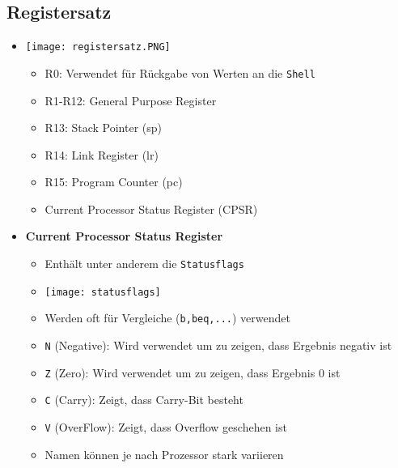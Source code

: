 \subsection{Registersatz}
    \begin{itemize}
        \item[]
            \begin{minipage}{0.2\textwidth}
            \texttt{[image: registersatz.PNG]}
            \end{minipage}
            \begin{minipage}[t]{0.7\textwidth}
            \vspace{-3cm}
                \begin{itemize}
                    \item R0: Verwendet für Rückgabe von Werten an die \texttt{Shell}
                    \item R1-R12: General Purpose Register
                    \item R13: Stack Pointer (sp)
                    \item R14: Link Register (lr)
                    \item R15: Program Counter (pc)
                    \item Current Processor Status Register (CPSR)
                \end{itemize}
            \end{minipage}
        \item \textbf{Current Processor Status Register}
            \begin{itemize}
                \item Enthält unter anderem die \texttt{Statusflags}
                \item[] \texttt{[image: statusflags]}
                \item Werden oft für Vergleiche (\texttt{b,beq,...}) verwendet 
                \item \texttt{N} (Negative): Wird verwendet um zu zeigen, dass Ergebnis negativ ist
                \item \texttt{Z} (Zero): Wird verwendet um zu zeigen, dass Ergebnis 0 ist 
                \item \texttt{C} (Carry): Zeigt, dass Carry-Bit besteht 
                \item \texttt{V} (OverFlow): Zeigt, dass Overflow geschehen ist 
                \item Namen können je nach Prozessor stark variieren
            \end{itemize}
    \end{itemize}

